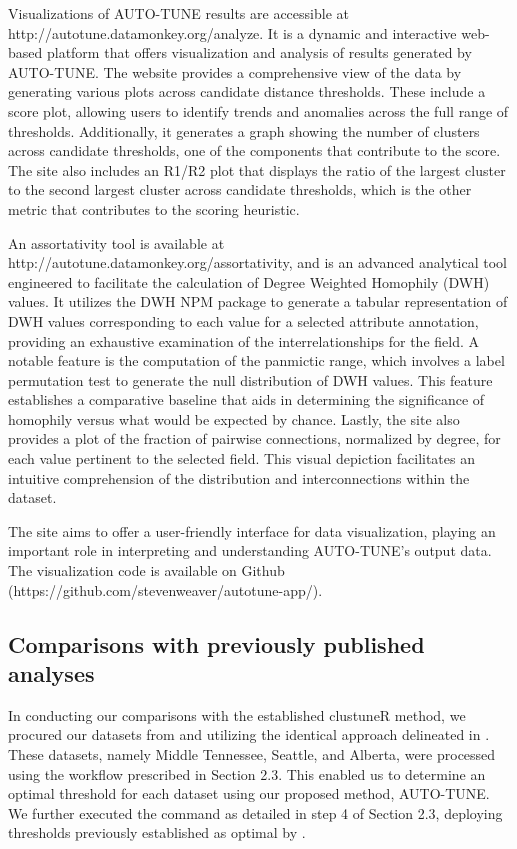 \documentclass[utf8]{FrontiersinHarvard} %
\begin{document}
Visualizations of AUTO-TUNE results are accessible at http://autotune.datamonkey.org/analyze. It is a dynamic and interactive web-based platform that offers visualization and analysis of results generated by AUTO-TUNE. 
The website provides a comprehensive view of the data by generating various plots across candidate distance thresholds. These include a score plot, allowing users to identify trends and anomalies across the full range of thresholds. Additionally, it generates a graph showing the number of clusters across candidate thresholds, one of the components that contribute to the score. The site also includes an R1/R2 plot that displays the ratio of the largest cluster to the second largest cluster across candidate thresholds, which is the other metric that contributes to the scoring heuristic. 

An assortativity tool is available at http://autotune.datamonkey.org/assortativity, and is an advanced analytical tool engineered to facilitate the calculation of Degree Weighted Homophily (DWH) values. It utilizes the DWH NPM package to generate a tabular representation of DWH values corresponding to each value for a selected attribute annotation, providing an exhaustive examination of the interrelationships for the field.
A notable feature is the computation of the panmictic range, which involves a label permutation test to generate the null distribution of DWH values. This feature establishes a comparative baseline that aids in determining the significance of homophily versus what would be expected by chance.
Lastly, the site also provides a plot of the fraction of pairwise connections, normalized by degree, for each value pertinent to the selected field. This visual depiction facilitates an intuitive comprehension of the distribution and interconnections within the dataset.

The site aims to offer a user-friendly interface for data visualization, playing an important role in interpreting and understanding AUTO-TUNE's output data. The visualization code is available on Github (https://github.com/stevenweaver/autotune-app/).


\subsection{Comparisons with previously published analyses}

In conducting our comparisons with the established clustuneR method, we
procured our datasets from \cite{wolf_short_2017} and
\cite{vrancken_multi-faceted_2017} utilizing the identical approach delineated
in \cite{chato_public_2020}. These datasets, namely Middle Tennessee,
Seattle, and Alberta, were processed using the workflow prescribed
in Section 2.3. This enabled us to determine an optimal threshold for each
dataset using our proposed method, AUTO-TUNE. We further executed the command
as detailed in step 4 of Section 2.3, deploying thresholds previously
established as optimal by \cite{chato_public_2020}.
\end{document}
